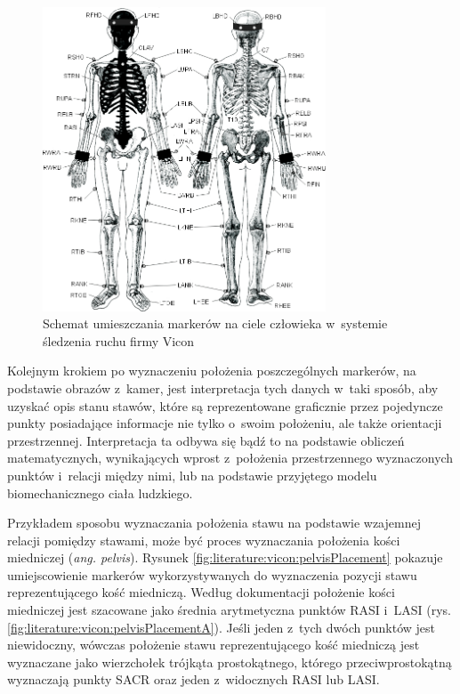 \begin{savenotes}
	\begin{figure}[!htb]
		\centering	
		\includegraphics[width=0.75\textwidth]{images/markerPlacement.jpg}
		\caption[Rysunek przedstawiający schemat umieszczania markerów na ciele człowieka w~systemie śledzenia ruchu firmy Vicon]{Schemat umieszczania markerów na ciele człowieka w~systemie śledzenia ruchu firmy Vicon\cite{ViconGaitPlacement}}
		\label{fig:literature:vicon:markerPlacement}
	\end{figure}
\end{savenotes}
																			
Kolejnym krokiem po wyznaczeniu położenia poszczególnych markerów, na podstawie obrazów z~kamer, jest interpretacja tych danych w~taki sposób, aby uzyskać opis stanu stawów, które są reprezentowane graficznie przez pojedyncze punkty posiadające informacje nie tylko o~swoim położeniu, ale także orientacji przestrzennej. Interpretacja ta odbywa się bądź to na podstawie obliczeń matematycznych, wynikających wprost z~położenia przestrzennego wyznaczonych punktów i~relacji między nimi, lub na podstawie przyjętego modelu biomechanicznego ciała ludzkiego. 

Przykładem sposobu wyznaczania położenia stawu na podstawie wzajemnej relacji pomiędzy stawami, może być proces wyznaczania położenia kości miedniczej (\emph{ang. pelvis}). Rysunek \ref{fig:literature:vicon:pelvisPlacement} pokazuje umiejscowienie markerów wykorzystywanych do wyznaczenia pozycji stawu reprezentującego kość miedniczą. Według dokumentacji \cite{ViconModelingInstruction} położenie kości miedniczej jest szacowane jako średnia arytmetyczna punktów RASI i~LASI (rys. \ref{fig:literature:vicon:pelvisPlacementA}). Jeśli jeden z~tych dwóch punktów jest niewidoczny, wówczas położenie stawu reprezentującego kość miedniczą jest wyznaczane jako wierzchołek trójkąta prostokątnego, którego przeciwprostokątną wyznaczają punkty SACR oraz jeden z~widocznych RASI lub LASI.
																	
